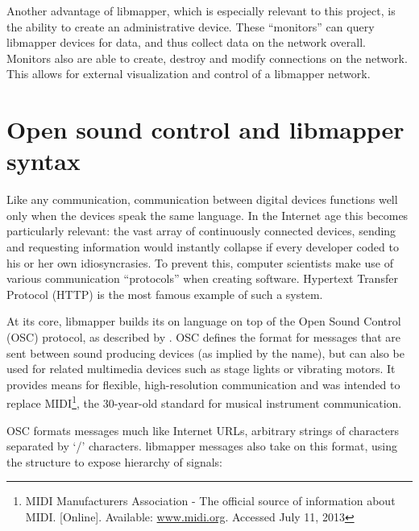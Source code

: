 Another advantage of libmapper, which is especially relevant to this project, is the ability to create an administrative device. These ``monitors'' can query libmapper devices for data, and thus collect data on the network overall. Monitors also are able to create, destroy and modify connections on the network. This allows for external visualization and control of a libmapper network.

	\section{Open sound control and libmapper syntax} %
	\label{sec:open_sound_control_and_libmapper_syntax}

Like any communication, communication between digital devices functions well only when the devices speak the same language. In the Internet age this becomes particularly relevant: the vast array of continuously connected devices, sending and requesting information would instantly collapse if every developer coded to his or her own idiosyncrasies. To prevent this, computer scientists make use of various communication ``protocols'' when creating software. Hypertext Transfer Protocol (HTTP) is the most famous example of such a system.

At its core, libmapper builds its on language on top of the Open Sound Control (OSC) protocol, as described by . OSC defines the format for messages that are sent between sound producing devices (as implied by the name), but can also be used for related multimedia devices such as stage lights or vibrating motors. It provides means for flexible, high-resolution communication and was intended to replace MIDI\footnote{MIDI Manufacturers Association - The official source of information about MIDI. [Online]. Available: \url{www.midi.org}. Accessed July 11, 2013}, the 30-year-old standard for musical instrument communication. 

OSC formats messages much like Internet URLs, arbitrary strings of characters separated by `/' characters. libmapper messages also take on this format, using the structure to expose hierarchy of signals:

